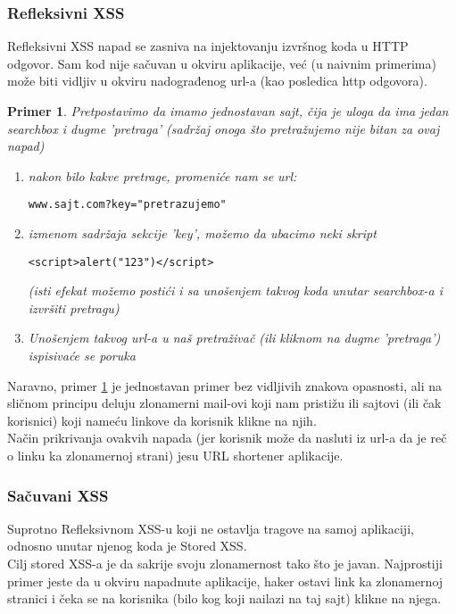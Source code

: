 \documentclass[a4paper]{article}
\newtheorem{primer}{Primer}[section]
\begin{document}
\subsubsection{Refleksivni XSS}

Refleksivni XSS napad se zasniva na injektovanju izvršnog koda u HTTP odgovor. Sam kod nije sačuvan u okviru aplikacije, već (u naivnim primerima) može biti vidljiv u okviru nadograđenog url-a (kao posledica http odgovora).
\begin{primer}
\label{primer1}
Pretpostavimo da imamo jednostavan sajt, čija je uloga da ima jedan searchbox i dugme 'pretraga' (sadržaj onoga što pretražujemo nije bitan za ovaj napad)
\begin{enumerate}
\item nakon bilo kakve pretrage, promeniće nam se url: 
\begin{lstlisting}
www.sajt.com?key="pretrazujemo"
\end{lstlisting}
\item izmenom sadržaja sekcije 'key', možemo da ubacimo neki skript

\begin{lstlisting}
<script>alert("123")</script>
\end{lstlisting}

(isti efekat možemo postići i sa unošenjem takvog koda unutar searchbox-a i izvršiti pretragu)
\item Unošenjem takvog url-a u naš pretraživač (ili kliknom na dugme 'pretraga') ispisivaće se poruka \\

\end{enumerate}
\end{primer}

 Naravno, primer \ref{primer1} je jednostavan primer bez vidljivih znakova opasnosti, ali na sličnom principu deluju zlonamerni mail-ovi koji nam pristižu ili sajtovi (ili čak korisnici) koji nameću linkove da korisnik klikne na njih.\\
Način prikrivanja ovakvih napada (jer korisnik može da nasluti iz url-a da je reč o linku ka zlonamernoj strani) jesu URL shortener aplikacije.

\subsubsection{Sačuvani XSS}

Suprotno Refleksivnom XSS-u koji ne ostavlja tragove na samoj aplikaciji, odnosno unutar njenog koda je Stored XSS.\\ Cilj stored XSS-a je da sakrije svoju zlonamernost tako što je javan. Najprostiji primer jeste da u okviru napadnute aplikacije, haker ostavi link ka zlonamernoj stranici i čeka se na korisnika (bilo kog koji nailazi na taj sajt) klikne na njega.
\end{document}
